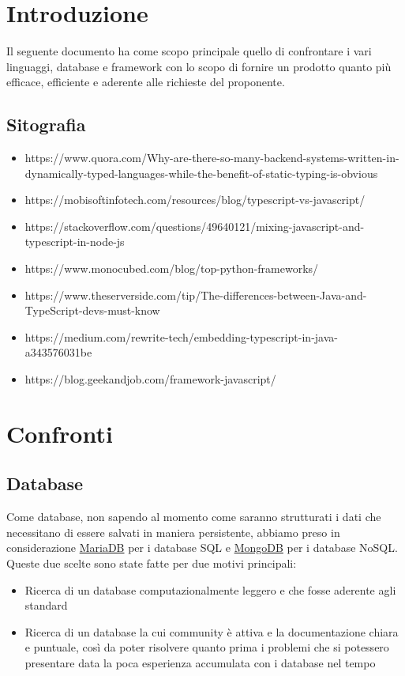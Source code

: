 \documentclass[a4paper, 12pt]{article}
\begin{document}
\makeindexdetails
\makefrontpage \makeversioni
\tableofcontents
\newpage
\clearpage
{}
\newpage
\section{Introduzione}
Il seguente documento ha come scopo principale quello di confrontare i vari linguaggi, database e framework con lo scopo di fornire un prodotto quanto più efficace, efficiente e aderente alle richieste del proponente.\\
\subsection{Sitografia}
\begin{itemize}
    \item https://www.quora.com/Why-are-there-so-many-backend-systems-written-in-dynamically-typed-languages-while-the-benefit-of-static-typing-is-obvious
    \item https://mobisoftinfotech.com/resources/blog/typescript-vs-javascript/
    \item https://stackoverflow.com/questions/49640121/mixing-javascript-and-typescript-in-node-js
    \item https://www.monocubed.com/blog/top-python-frameworks/
    \item https://www.theserverside.com/tip/The-differences-between-Java-and-TypeScript-devs-must-know
    \item https://medium.com/rewrite-tech/embedding-typescript-in-java-a343576031be
    \item https://blog.geekandjob.com/framework-javascript/
\end{itemize}

\newpage
\section{Confronti}
\subsection{Database}
Come database, non sapendo al momento come saranno strutturati i dati che necessitano di essere salvati in maniera persistente, abbiamo preso in considerazione \href{https://mariadb.org/}{MariaDB} per i database SQL e \href{https://www.mongodb.com/}{MongoDB} per i database NoSQL. \\
Queste due scelte sono state fatte per due motivi principali:
\begin{itemize}
    \item Ricerca di un database computazionalmente leggero e che fosse aderente agli standard
    \item Ricerca di un database la cui community è attiva e la documentazione chiara e puntuale, così da poter risolvere quanto prima i problemi che si potessero presentare data la poca esperienza accumulata con i database nel tempo
\end{itemize}
\end{document}
